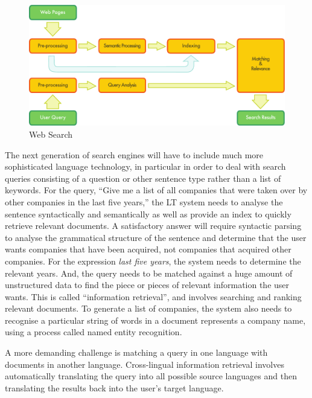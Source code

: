 \begin{multicols}{2}
\begin{figure}[htb]
  \center
  \includegraphics[width=\textwidth]{../_media/english/web_search_architecture}
  \caption{Web Search}
  \label{fig:websearcharch-eng}
 \end{figure}


The next generation of search engines will have to include much more sophisticated language technology, in particular in order to deal with search queries consisting of a question or other sentence type rather than a list of keywords. For the query, ``Give me a list of all companies that were taken over by other companies in the last five years,'' the LT system needs to analyse the sentence syntactically and semantically as well as provide an index to quickly retrieve relevant documents. A satisfactory answer will require syntactic parsing to analyse the grammatical structure of the sentence and determine that the user wants companies that have been acquired, not companies that acquired other companies. For the expression \textit{last five years}, the system needs to determine the relevant years. And, the query needs to be matched against a huge amount of unstructured data to find the piece or pieces of relevant information the user wants. This is called ``information retrieval'', and involves searching and ranking relevant documents. To generate a list of companies, the system also needs to recognise a particular string of words in a document represents a company name, using a process called named entity recognition.

A more demanding challenge is matching a query in one language with documents in another language. Cross-lingual information retrieval involves automatically translating the query into all possible source languages and then translating the results back into the user's target language.


\end{multicols}
